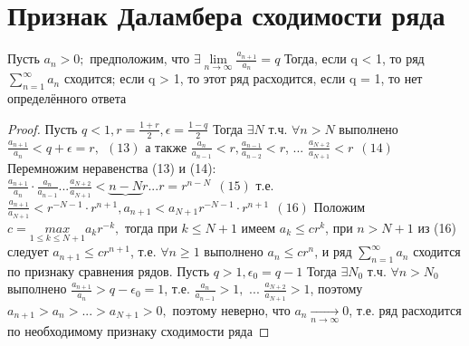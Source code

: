 \section{Признак Даламбера сходимости ряда}
\begin{theorem}
	Пусть $a_n > 0;$ предположим, что $\exists \lim\limits_{n \to \infty}{\frac{a_{n+1}}{a_n}} = q$ Тогда, если q < 1, то ряд $\sum_{n=1}^{\infty}{a_n}$ сходится; если q > 1, то 
	этот ряд расходится, если q = 1, то нет определённого ответа
\end{theorem}
\begin{proof}
	Пусть $q < 1, r = \frac{1+r}{2}, \epsilon = \frac{1-q}{2}$ Тогда $\exists N$ т.ч. $\forall n > N$ выполнено $\frac{a_{n+1}}{a_n} < q + \epsilon = r, \ \ (13)$ а также $\frac{a_n}{a_{n-1}}<r,\frac{a_{n-1}}{a_{n-2}} < r$, ... $\frac{a_{N+2}}{a_{N+1}} < r \ \ (14)$ Перемножим неравенства (13) и (14): $\frac{a_{n+1}}{a_n} \cdot \frac{a_n}{a_{n-1}}...\frac{a_{N+2}}{a_{N+1}} < \underbrace{n - N}{ r...r} = r^{n-N} \ \ (15)$ т.е. $\frac{a_{n+1}}{a_{N+1}} < r^{-N-1}\cdot r^{n+1}, a_{n+1} < a_{N+1}r^{-N-1}\cdot r^{n+1} \ \ (16)$ Положим $c = \underset{1 \leq k \leq N+ 1}{max}a_kr^{-k},$ тогда при $k \leq N +1$ имеем $a_k \leq cr^k$, при $n > N +1$ из (16) следует $a_{n+1} \leq cr^{n+1}$, т.е. $\forall n \geq 1$ выполнено $a_n \leq cr^n$, и ряд $\sum_{n = 1}^{\infty}{a_n}$ сходится по признаку сравнения рядов. Пусть $q > 1, \epsilon_0 = q -1$ Тогда $\exists N_0$ т.ч. $\forall n > N_0$ выполнено $\frac{a_{n+1}}{a_n} > q - \epsilon_0 = 1$, т.е. $\frac{a_n}{a_{n-1}} > 1,$ ... $\frac{a_{N+2}}{a_{N+1}} > 1$, поэтому $a_{n+1} > a_n >...>a_{N+1} > 0,$ поэтому неверно, что $a_n \underset{n \to \infty}{\to} 0$, т.е. ряд расходится по необходимому признаку сходимости ряда
\end{proof}
